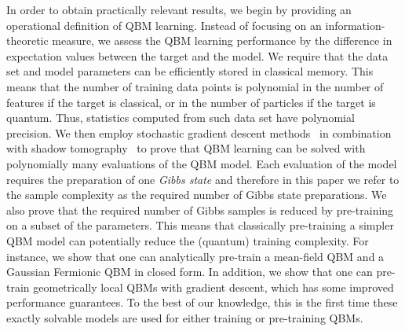 \documentclass[
    reprint,
    aps,
    prx,
    longbibliography
]{revtex4-2}
\begin{document}
In order to obtain practically relevant results, we begin by providing an operational definition of QBM learning. Instead of focusing on an information-theoretic measure, we assess the QBM learning performance by the difference in expectation values between the target and the model. We require that the data set and model parameters can be efficiently stored in classical memory. This means that the number of training data points is polynomial in the number of features if the target is classical, or in the number of particles if the target is quantum. Thus, statistics computed from such data set have polynomial precision. We then employ stochastic gradient descent methods~\cite{Khaled2020, Garrigos2023} in combination with shadow tomography~\cite{Aaronson_2017, Huang_2021, Rouze_2023} to prove that QBM learning can be solved with polynomially many evaluations of the QBM model. Each evaluation of the model requires the preparation of one \emph{Gibbs state} and therefore in this paper we refer to the sample complexity as the required number of Gibbs state preparations. We also prove that the required number of Gibbs samples is reduced by pre-training on a subset of the parameters. This means that classically pre-training a simpler QBM model can potentially reduce the (quantum) training complexity. For instance, we show that one can analytically pre-train a mean-field QBM and a Gaussian Fermionic QBM in closed form. In addition, we show that one can pre-train geometrically local QBMs with gradient descent, which has some improved performance guarantees. To the best of our knowledge, this is the first time these exactly solvable models are used for either training or pre-training QBMs.
\end{document}
